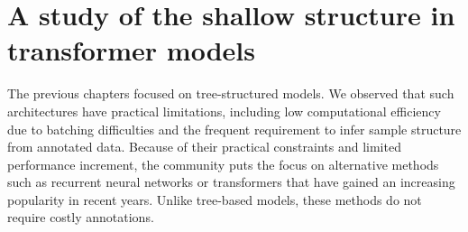 \setchapterpreamble[u]{\margintoc}
\chapter{A study of the shallow structure in transformer models}



The previous chapters focused on tree-structured models. We observed that such architectures have practical limitations, including low computational efficiency due to batching difficulties and the frequent requirement to infer sample structure from annotated data. Because of their practical constraints and limited performance increment, the community puts the focus on 
alternative methods such as recurrent neural networks \parencite{hochreiter_97, cho_14} or transformers \parencite{vaswani_17} that have gained an increasing popularity in recent years. Unlike tree-based models, these methods do not require costly annotations.

